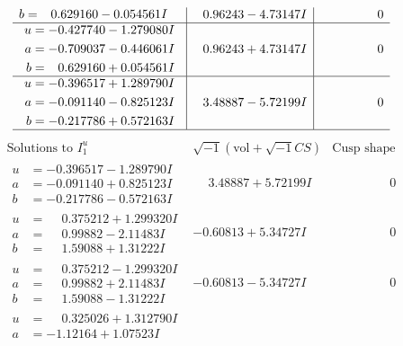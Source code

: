 \documentclass[1p]{elsarticle_modified}
\theoremstyle{definition}
\newcommand{\I}{\sqrt{-1}}
\begin{document}
$$\begin{array}{c|c|c}
\begin{aligned}
b &= \phantom{-}0.629160 - 0.054561 I\end{aligned}
 & \phantom{-}0.96243 - 4.73147 I & \phantom{-0.000000 } 0 \\ \hline\begin{aligned}
u &= -0.427740 - 1.279080 I \\
a &= -0.709037 - 0.446061 I \\
b &= \phantom{-}0.629160 + 0.054561 I\end{aligned}
 & \phantom{-}0.96243 + 4.73147 I & \phantom{-0.000000 } 0 \\ \hline\begin{aligned}
u &= -0.396517 + 1.289790 I \\
a &= -0.091140 - 0.825123 I \\
b &= -0.217786 + 0.572163 I\end{aligned}
 & \phantom{-}3.48887 - 5.72199 I & \phantom{-0.000000 } 0\\
 \hline 
 \end{array}$$\newpage$$\begin{array}{c|c|c}  
\text{Solutions to }I^u_{1}& \I (\text{vol} + \sqrt{-1}CS) & \text{Cusp shape}\\
 \hline 
\begin{aligned}
u &= -0.396517 - 1.289790 I \\
a &= -0.091140 + 0.825123 I \\
b &= -0.217786 - 0.572163 I\end{aligned}
 & \phantom{-}3.48887 + 5.72199 I & \phantom{-0.000000 } 0 \\ \hline\begin{aligned}
u &= \phantom{-}0.375212 + 1.299320 I \\
a &= \phantom{-}0.99882 - 2.11483 I \\
b &= \phantom{-}1.59088 + 1.31222 I\end{aligned}
 & -0.60813 + 5.34727 I & \phantom{-0.000000 } 0 \\ \hline\begin{aligned}
u &= \phantom{-}0.375212 - 1.299320 I \\
a &= \phantom{-}0.99882 + 2.11483 I \\
b &= \phantom{-}1.59088 - 1.31222 I\end{aligned}
 & -0.60813 - 5.34727 I & \phantom{-0.000000 } 0 \\ \hline\begin{aligned}
u &= \phantom{-}0.325026 + 1.312790 I \\
a &= -1.12164 + 1.07523 I \\

\end{aligned}
\end{array}$$
\end{document}
